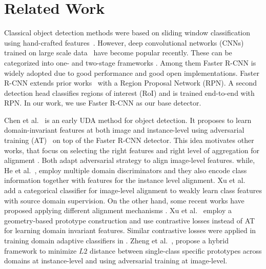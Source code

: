 \documentclass[10pt,twocolumn,letterpaper]{article}
\begin{document}
\section{Related Work}
\label{sec:related}
 Classical object detection methods were based on sliding window classification using hand-crafted features~\cite{dalal2005histograms, viola2001rapid, felzenszwalb2009object}. 
However, deep convolutional networks (CNNs)~\cite{krizhevsky2017imagenet, he2016deep, simonyan2014very} trained on large scale data~\cite{Chen2015, pascal} have become popular recently. 
These can be categorized into one- \cite{liu2016ssd, redmon2016you,redmon2017yolo9000} and two-stage frameworks \cite{girshick2014rich, girshick2015fast, he2015spatial, ren2015faster}. Among them Faster R-CNN \cite{ren2015faster} is widely adopted due to good performance and good open implementations. 
Faster R-CNN extends prior works~\cite{girshick2014rich, girshick2015fast} with a Region Proposal Network (RPN). 
A second detection head classifies regions of interest (RoI) and is trained end-to-end with RPN. In our work, we use Faster R-CNN as our base detector. 


 Chen et al.\ \cite{da_faster_rcnn} is an early UDA method for object detection. It proposes to learn domain-invariant features at both image and instance-level using adversarial training (AT)~\cite{grl_ganin} on top of the Faster R-CNN detector.
This idea motivates other works, that focus on selecting the right features and right level of aggregation for alignment \cite{strong-weak, he_iccv19_MAF, zhu_cvpr19_selective_alignment, xu_cvpr20_icr_ccr, chen_cvpr20_htcn}. Both \cite{strong-weak, he_iccv19_MAF} adapt adversarial strategy to align image-level features.
while, He et al.\ \cite{he_iccv19_MAF}, employ multiple domain discriminators and they also encode class information together with features for the instance level alignment. 
Xu et al.\ \cite{xu_cvpr20_icr_ccr} add a categorical classifier for image-level alignment to weakly learn class features with source domain supervision. On the other hand, some recent works have proposed applying different alignment mechanisms \cite{ zhuang_2020_ifan, zheng_cvpr20_prototype, GPA}. Xu et al.\ \cite{GPA} employ a geometry-based prototype construction and use contrastive losses instead of AT for learning domain invariant features. 
Similar contrastive losses were applied in training domain adaptive classifiers in \cite{kang2019contrastive}.
Zheng et al.\ \cite{zheng_cvpr20_prototype}, propose a hybrid framework to minimize $L2$ distance between single-class specific prototypes across domains at instance-level and using adversarial training at image-level.
\end{document}
